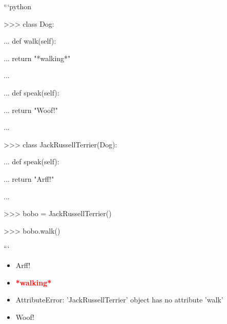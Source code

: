 \documentclass[12pt,a4paper]{article}
\begin{document}
\newline
\newline

\newline
```python\newline

\newline
>>> class Dog:\newline

\newline
...     def walk(self):\newline

\newline
...         return "*walking*"\newline

\newline
...\newline

\newline
...     def speak(self):\newline

\newline
...         return "Woof!"\newline

\newline
...\newline

\newline
>>> class JackRussellTerrier(Dog):\newline

\newline
...     def speak(self):\newline

\newline
...         return "Arff!"\newline

\newline
...\newline

\newline
>>> bobo = JackRussellTerrier()\newline

\newline
>>> bobo.walk()\newline

\newline
```

\begin{itemize}
    \item[\textbf{A.}] Arff!
    \item[\textbf{B.}] \textcolor{red}{\textbf{*walking*}}
    \item[\textbf{C.}] AttributeError: 'JackRussellTerrier' object has no attribute 'walk'
    \item[\textbf{D.}] Woof!
\end{itemize}
\end{document}
